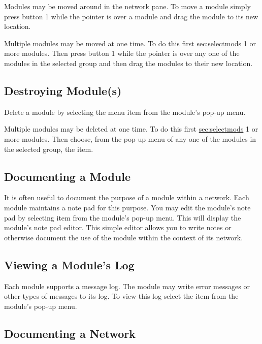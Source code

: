 Modules may be moved around in the network pane.  To move a module simply
press button 1 while the pointer is over a module and drag the module to
its new location.

Multiple modules may be moved at one time.  To do this first
\hyperref{select}{select (see Section~}{)}{sec:selectmods} 1 or more
modules. Then press button 1 while the pointer is over any one of the
modules in the selected group and then drag the modules to their new location.


\subsection{Destroying Module(s)}
\label{sec:destroymod}

Delete a module by selecting the  menu item from the
module's pop-up menu.

Multiple modules may be deleted at one time.  To do this first
\hyperref{select}{select (see Section~}{)}{sec:selectmods} 1 or more
modules. Then choose, from the pop-up menu of any one of the modules in the
selected group, the  item.


\subsection{Documenting a Module}
\label{sec:docmodule}

It is often useful to document the purpose of a module within a network.
Each module maintains a note pad for this purpose.  You may edit the
module's note pad by selecting  item from the module's
pop-up menu.  This will display the module's note pad editor.  This simple
editor allows you to write notes or otherwise document the use of the
module within the context of its network.

\subsection{Viewing a Module's Log}
\label{sec:viewmodslog}

Each module supports a message log.  The module may write error messages or
other types of messages to its log.  To view this log select the
 item from the module's pop-up menu.

\subsection{Documenting a Network}
\label{sec:docnetwork}

